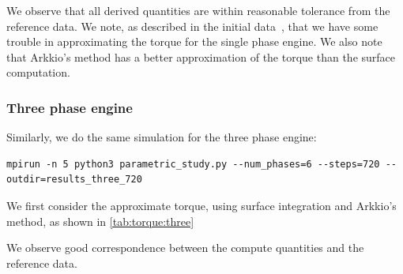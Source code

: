\documentclass{article}
\begin{document}
We observe that all derived quantities are within reasonable tolerance
from the reference data. We note, as described in the initial
data~\cite{daveyteam30}, that we have some trouble in approximating the
torque for the single phase engine. We also note that Arkkio's method
has a better approximation of the torque than the surface computation.

\subsubsection{Three phase engine}

Similarly, we do the same simulation for the three phase engine:
\begin{lstlisting}[style=pythoncustom, numbers=none]
mpirun -n 5 python3 parametric_study.py --num_phases=6 --steps=720 --outdir=results_three_720
\end{lstlisting}
We first consider the approximate torque, using surface integration and
Arkkio's method, as shown in \cref{tab:torque:three}


We observe good correspondence between the compute quantities and the
reference data.



\end{document}
